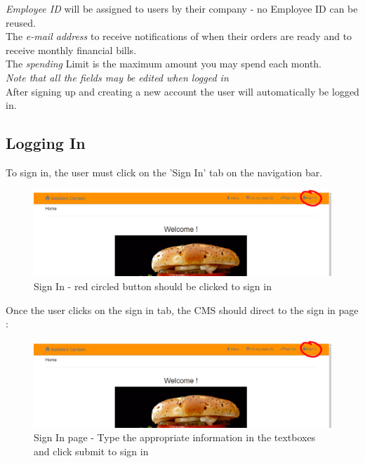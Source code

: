 \documentclass[a4paper,12pt]{report}
\begin{document}
{\em Employee ID } will be assigned to users by their company - no Employee ID can be reused.\\
The {\em e-mail address} to receive notifications of when their orders are ready and to receive monthly financial bills. \\
The {\em spending} Limit is the maximum amount you may spend each month.\\

{\em Note that all the fields may be edited when logged in} \\

After signing up and creating a new account the user will automatically be logged in. 

\subsection{Logging In}
To sign in, the user must click on the 'Sign In' tab on the navigation bar.

\begin{figure}[H]
  \centering
    \includegraphics[width=1.0\textwidth]{screenshots/signIn.png}
    \caption{Sign In - red circled button should be clicked to sign in} 
\end{figure}

Once the user clicks on the sign in tab, the CMS should direct to the sign in page :

\begin{figure}[H]
  \centering
    \includegraphics[width=1.0\textwidth]{screenshots/signIn.png}
    \caption{Sign In page - Type the appropriate information in the textboxes and click submit to sign in} 
\end{figure}
  
\end{document}
